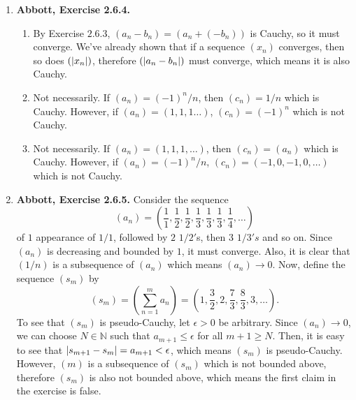 \documentclass{article}
\DeclarePairedDelimiter\abs{\lvert}{\rvert}
\newcommand{\N}{\mathbb{N}}
\newcommand{\R}{\mathbb{R}}
\newcommand{\ra}{\rightarrow}
\newcommand{\exc}[2][Abbott]{\item \textbf{#1, Exercise #2.}}
\newcommand{\lep}[1][L]{#1et $\epsilon > 0$ be arbitrary}
\begin{document}
\begin{enumerate}
\begin{enumerate}
        \item \lep. Since both sequences are Cauchy, we can pick some positive $M_1, M_2 \in \R$ such that $\abs*{x_n} \leq M_1$ and $\abs*{y_n} \leq M_2$ for all $n \in \N$. Choose $N \in \N$ such that $\abs*{x_n-x_m} < \epsilon/(2M_2)$ and $\abs*{y_n-y_m} < \epsilon/(2M_1)$ for all $n, m \geq N$. Then,
        \begin{align*}
            \abs*{x_n y_n - x_m y_m} &= \abs*{x_n y_n - x_n y_m + x_n y_m - x_m y_m} \\
            &\leq \abs*{x_n} \abs*{y_n - y_m} + \abs*{y_m} \abs*{x_n - x_m} \\ &\leq M_1 \abs*{y_n-y_m} + M_2 \abs*{x_n - x_m} < \epsilon
        \end{align*} for all $n,m \geq N$, so $(x_n y_n)$ is Cauchy.
    \end{enumerate}
    
    \exc{2.6.4}
    \begin{enumerate}
        \item By Exercise $2.6.3$, $(a_n - b_n) = (a_n + (-b_n))$ is Cauchy, so it must converge. We've already shown that if a sequence $(x_n)$ converges, then so does $(\abs*{x_n})$, therefore $(\abs*{a_n-b_n})$ must converge, which means it is also Cauchy.
        
        \item Not necessarily. If $(a_n) = (-1)^n/n$, then $(c_n) = 1/n$ which is Cauchy. However, if $(a_n) = (1,1,1\dots)$, $(c_n) = (-1)^n$ which is not Cauchy.
        
        \item Not necessarily. If $(a_n) = (1,1,1,\dots)$, then $(c_n) = (a_n)$ which is Cauchy. However, if $(a_n) = (-1)^n/n$, $(c_n) = (-1, 0,-1, 0, \dots)$ which is not Cauchy.
    \end{enumerate}
    
    \exc{2.6.5}
    Consider the sequence 
    \begin{equation*}
        (a_n) = (\frac{1}{1}, \frac{1}{2}, \frac{1}{2}, \frac{1}{3}, \frac{1}{3}, \frac{1}{3}, \frac{1}{4}, \dots)
    \end{equation*} of $1$ appearance of $1/1$, followed by $2$ $1/2'$s, then $3$ $1/3's$ and so on. Since $(a_n)$ is decreasing and bounded by $1$, it must converge. Also, it is clear that $(1/n)$ is a subsequence of $(a_n)$ which means $(a_n) \ra 0$. Now, define the sequence $(s_m)$ by
    \begin{equation*}
        (s_m) = (\sum_{n=1}^m a_n) = (1, \frac{3}{2}, 2, \frac{7}{3}, \frac{8}{3}, 3, \dots).
    \end{equation*} To see that $(s_m)$ is pseudo-Cauchy, \lep[l]. Since $(a_n) \ra 0$, we can choose $N \in \N$ such that $a_{m+1} \leq \epsilon$ for all $m+1 \geq N$. Then, it is easy to see that $\abs*{s_{m+1}-s_m} = a_{m+1} < \epsilon$, which means $(s_m)$ is pseudo-Cauchy. However, $(m)$ is a subsequence of $(s_m)$ which is not bounded above, therefore $(s_m)$ is also not bounded above, which means the first claim in the exercise is false.
    

\end{enumerate}
\end{document}
